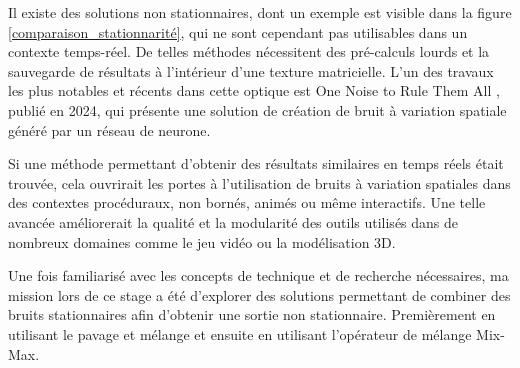 \documentclass{article}
\begin{document}
Il existe des solutions non stationnaires, dont un exemple est visible dans la
figure \ref{comparaison_stationnarité}, qui ne sont cependant pas utilisables
dans un contexte temps-réel. De telles méthodes nécessitent des pré-calculs
lourds et la sauvegarde de résultats à l'intérieur d'une texture matricielle.
L'un des travaux les plus notables et récents dans cette optique est One Noise
to Rule Them All \cite{One_Noise}, publié en 2024, qui présente une solution de
création de bruit à variation spatiale généré par un réseau de neurone.

Si une méthode permettant d'obtenir des résultats similaires en temps réels
était trouvée, cela ouvrirait les portes à l'utilisation de bruits à variation
spatiales dans des contextes procéduraux, non bornés, animés ou même
interactifs. Une telle avancée améliorerait la qualité et la modularité des
outils utilisés dans de nombreux domaines comme le jeu vidéo ou la modélisation
3D.

Une fois familiarisé avec les concepts de technique et de recherche
nécessaires, ma mission lors de ce stage a été d'explorer des solutions
permettant de combiner des bruits stationnaires afin d'obtenir une sortie non
stationnaire. Premièrement en utilisant le pavage et mélange\cite{HPnoise} et
ensuite en utilisant l'opérateur de mélange Mix-Max\cite{mixmax}.
\end{document}
